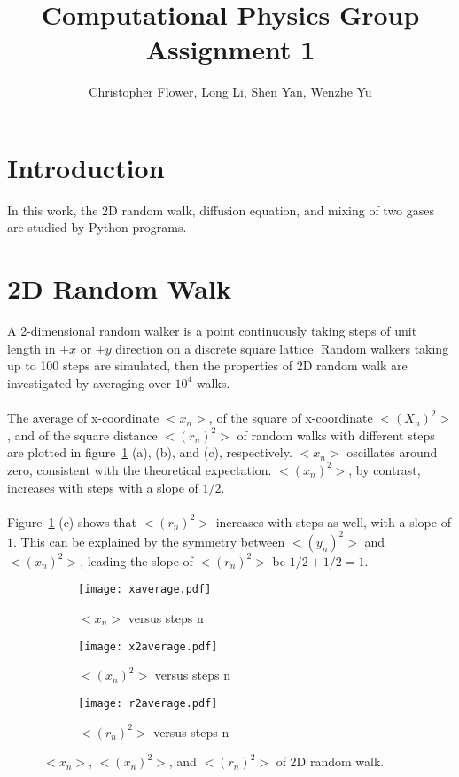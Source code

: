 \documentclass{article}
\begin{document}
\title{\textbf{Computational Physics Group Assignment 1}}
\author{Christopher Flower, Long Li, Shen Yan, Wenzhe Yu}
\maketitle

\section{Introduction}
In this work, the 2D random walk, diffusion equation, and mixing of two gases are studied by Python programs.

\section{2D Random Walk}
A 2-dimensional random walker is a point continuously taking steps of unit length in $\pm x$ or $\pm y$ direction on a discrete square lattice. Random walkers taking up to 100 steps are simulated, then the properties of 2D random walk are investigated by averaging over $10^4$ walks.\\
\\
The average of x-coordinate $<x_n>$, of the square of x-coordinate $<(X_n)^2>$, and of the square distance $<(r_n)^2>$ of random walks with different steps are plotted in figure~\ref{random} (a), (b), and (c), respectively. $<x_n>$ oscillates around zero, consistent with the theoretical expectation. $<(x_n)^2>$, by contrast, increases with steps with a slope of $1/2$.\\
\\
Figure~\ref{random} (c) shows that $<(r_n)^2>$ increases with steps as well, with a slope of $1$. This can be explained by the symmetry between  $<(y_n)^2>$ and $<(x_n)^2>$, leading the slope of $<(r_n)^2>$ be $1/2+1/2 = 1$.\\

\begin{figure}[h!]
\centering
\begin{subfigure}[b]{0.32\textwidth}
\texttt{[image: xaverage.pdf]}
\caption{$<x_n>$ versus steps n}
\end{subfigure}
\begin{subfigure}[b]{0.32\textwidth}
\texttt{[image: x2average.pdf]}
\caption{$<(x_n)^2>$ versus steps n}
\end{subfigure}
\begin{subfigure}[b]{0.32\textwidth}
\texttt{[image: r2average.pdf]}
\caption{$<(r_n)^2>$ versus steps n}
\end{subfigure}
\caption{$<x_n>$, $<(x_n)^2>$, and $<(r_n)^2>$ of 2D random walk.}
\label{random}
\end{figure}
\end{document}
